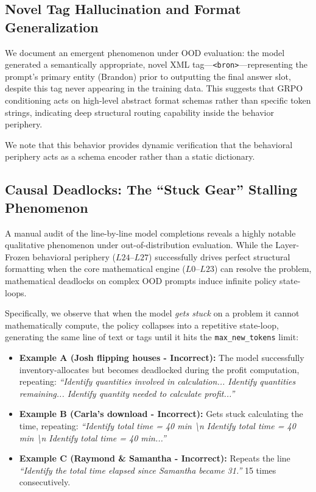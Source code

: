 \documentclass[11pt]{article}
\begin{document}
\subsection{Novel Tag Hallucination and Format Generalization}

We document an emergent phenomenon under OOD evaluation: the model generated a semantically appropriate, novel XML tag---\texttt{<bron>}---representing the prompt's primary entity (Brandon) prior to outputting the final answer slot, despite this tag never appearing in the training data. This suggests that GRPO conditioning acts on high-level abstract format schemas rather than specific token strings, indicating deep structural routing capability inside the behavior periphery.

We note that this behavior provides dynamic verification that the behavioral periphery acts as a schema encoder rather than a static dictionary.

\subsection{Causal Deadlocks: The ``Stuck Gear'' Stalling Phenomenon}

A manual audit of the line-by-line model completions reveals a highly notable qualitative phenomenon under out-of-distribution evaluation. While the Layer-Frozen behavioral periphery ($L24$--$L27$) successfully drives perfect structural formatting when the core mathematical engine ($L0$--$L23$) can resolve the problem, mathematical deadlocks on complex OOD prompts induce infinite policy state-loops. 

Specifically, we observe that when the model \textit{gets stuck} on a problem it cannot mathematically compute, the policy collapses into a repetitive state-loop, generating the same line of text or tags until it hits the \texttt{max\_new\_tokens} limit:
\begin{itemize}
    \item \textbf{Example A (Josh flipping houses - Incorrect):} The model successfully inventory-allocates but becomes deadlocked during the profit computation, repeating: \textit{``Identify quantities involved in calculation... Identify quantities remaining... Identify quantity needed to calculate profit...''}
    \item \textbf{Example B (Carla's download - Incorrect):} Gets stuck calculating the time, repeating: \textit{``Identify total time = 40 min \textbackslash n Identify total time = 40 min \textbackslash n Identify total time = 40 min...''}
    \item \textbf{Example C (Raymond \& Samantha - Incorrect):} Repeats the line \textit{``Identify the total time elapsed since Samantha became 31.''} 15 times consecutively.
\end{itemize}
\end{document}
